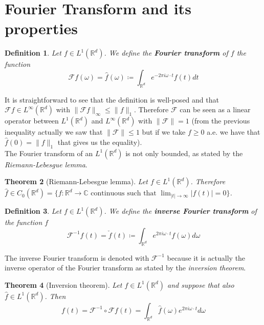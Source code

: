 \documentclass[corpo=11pt, stile=classica, tipotesi=custom,
greek, evenboxes, english]{toptesi}
\numberwithin{equation}{chapter}
\newtheorem{teo}{Theorem}[chapter] %
\newtheorem{defi}[teo]{Definition}
\newcommand{\R}{\mathbb{R}} %
\newcommand{\F}{\mathscr{F}} %
\newcommand{\C}{\mathbb{C}} %
\begin{document}
\section{Fourier Transform and its properties}\label{section Fourier transform and its properties}
\begin{defi}\label{Fourier transform def}
	Let $f \in L^1(\R^d)$. We define the \textbf{Fourier transform} of $f$ the function
	\begin{equation}\label{Fourier transform formula}
		\F f(\omega) = \hat{f}(\omega) \coloneqq \int_{\R^d} e^{-2 \pi i \omega \cdot t} f(t) dt
	\end{equation}
\end{defi}
It is straightforward to see that the definition is well-posed and that $\F f \in L^{\infty}(\R^d)$ with $\|\F f\|_{\infty} \leq \| f \|_1$. Therefore $\F$ can be seen as a linear operator between $L^1(\R^d)$ and $L^{\infty}(\R^d)$ with $\| \F \| = 1$ (from the previous inequality actually we saw that $\| \F \| \leq 1$ but if we take $f \geq 0$ a.e. we have that $\hat{f}(0) = \| f \|_1$ that gives us the equality).\\
The Fourier transform of an $L^1(\R^d)$ is not only bounded, as stated by the \emph{Riemann-Lebesgue lemma}.
\begin{teo}[Riemann-Lebesgue lemma]\label{Riemann-Lebesgue lemma}
	Let $f \in L^1(\R^d)$. Therefore $\hat{f} \in C_0(\R^d) = \{f : \R^d \rightarrow \C \text{ continuous such that } \lim_{|t| \rightarrow \infty} |f(t)|=0\}$.
\end{teo}
\begin{defi}\label{inverse Fourier transform def}
	Let $f \in L^1(\R^d)$. We define the \textbf{inverse Fourier transform} of the function $f$
	\begin{equation}\label{inverse Fourier transform formula}
		\F^{-1} f(t) = \check{f}(t) \coloneqq \int_{\R^d} e^{2 \pi i \omega \cdot t} f(\omega) d\omega
	\end{equation}
\end{defi}
The inverse Fourier transform is denoted with $\F^{-1}$ because it is actually the inverse operator of the Fourier transform as stated by the \emph{inversion theorem}.
\begin{teo}[Inversion theorem]\label{inversion theorem}
	Let $f \in L^1(\R^d)$ and suppose that also $\hat{f} \in L^1(\R^d)$. Then
	\begin{equation*}
		f(t) = \F^{-1} \circ \F f(t) = \int_{\R^d} \hat{f}(\omega) e^{2 \pi i \omega \cdot t}d\omega
	\end{equation*}
\end{teo}
\end{document}
